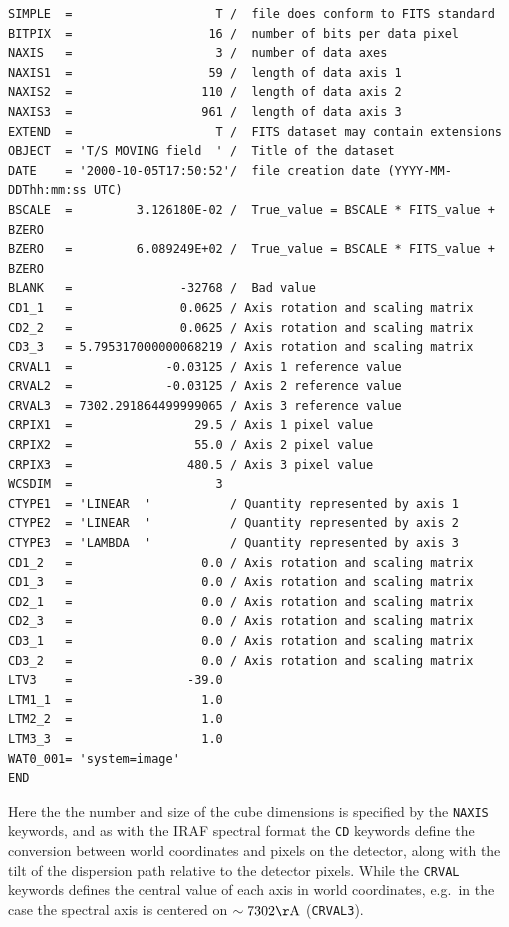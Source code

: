 \documentclass[twoside,11pt]{article}
\newcommand{\htmlref}[2]{#1}
\begin{document}
\small\begin{verbatim}
SIMPLE  =                    T /  file does conform to FITS standard
BITPIX  =                   16 /  number of bits per data pixel
NAXIS   =                    3 /  number of data axes                        
NAXIS1  =                   59 /  length of data axis 1 
NAXIS2  =                  110 /  length of data axis 2    
NAXIS3  =                  961 /  length of data axis 3    
EXTEND  =                    T /  FITS dataset may contain extensions   
OBJECT  = 'T/S MOVING field  ' /  Title of the dataset     
DATE    = '2000-10-05T17:50:52'/  file creation date (YYYY-MM-DDThh:mm:ss UTC) 
BSCALE  =         3.126180E-02 /  True_value = BSCALE * FITS_value + BZERO 
BZERO   =         6.089249E+02 /  True_value = BSCALE * FITS_value + BZERO 
BLANK   =               -32768 /  Bad value            
CD1_1   =               0.0625 / Axis rotation and scaling matrix 
CD2_2   =               0.0625 / Axis rotation and scaling matrix 
CD3_3   = 5.795317000000068219 / Axis rotation and scaling matrix 
CRVAL1  =             -0.03125 / Axis 1 reference value  
CRVAL2  =             -0.03125 / Axis 2 reference value    
CRVAL3  = 7302.291864499999065 / Axis 3 reference value 
CRPIX1  =                 29.5 / Axis 1 pixel value  
CRPIX2  =                 55.0 / Axis 2 pixel value   
CRPIX3  =                480.5 / Axis 3 pixel value  
WCSDIM  =                    3     
CTYPE1  = 'LINEAR  '           / Quantity represented by axis 1  
CTYPE2  = 'LINEAR  '           / Quantity represented by axis 2     
CTYPE3  = 'LAMBDA  '           / Quantity represented by axis 3 
CD1_2   =                  0.0 / Axis rotation and scaling matrix 
CD1_3   =                  0.0 / Axis rotation and scaling matrix 
CD2_1   =                  0.0 / Axis rotation and scaling matrix 
CD2_3   =                  0.0 / Axis rotation and scaling matrix   
CD3_1   =                  0.0 / Axis rotation and scaling matrix 
CD3_2   =                  0.0 / Axis rotation and scaling matrix 
LTV3    =                -39.0      
LTM1_1  =                  1.0        
LTM2_2  =                  1.0  
LTM3_3  =                  1.0  
WAT0_001= 'system=image' 
END                         
\end{verbatim}\normalsize

Here the the number and size of the cube dimensions is specified by the {\tt NAXIS} keywords, and as with the \htmlref{IRAF spectral format}{sc16_iraf} the {\tt CD} keywords define the conversion between world coordinates and pixels on the detector, along with the tilt of the dispersion path relative to the detector pixels. While the {\tt CRVAL} keywords defines the central value of each axis in world coordinates, e.g.\ in the case the spectral axis is centered on $\sim7302{\rm \AA}$ ({\tt CRVAL3}).
\end{document}
